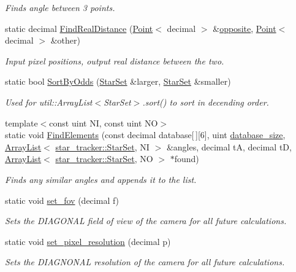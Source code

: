 \begin{DoxyCompactItemize}
\begin{DoxyCompactList}\small\item\em Finds angle between 3 points. \end{DoxyCompactList}\item 
static decimal \hyperlink{classstar__tracker_1_1StarSet_ac47b736928c744d3e5ec29a1362805e7}{Find\+Real\+Distance} (\hyperlink{classutil_1_1Point}{Point}$<$ decimal $>$ \&\hyperlink{classstar__tracker_1_1StarSet_aaefbde2ed32000e0d4a9a8104a685f0f}{opposite}, \hyperlink{classutil_1_1Point}{Point}$<$ decimal $>$ \&other)
\begin{DoxyCompactList}\small\item\em Input pixel positions, output real distance between the two. \end{DoxyCompactList}\item 
static bool \hyperlink{classstar__tracker_1_1StarSet_a6073fd52d08603e0e73729a8f6319b7c}{Sort\+By\+Odds} (\hyperlink{classstar__tracker_1_1StarSet}{Star\+Set} \&larger, \hyperlink{classstar__tracker_1_1StarSet}{Star\+Set} \&smaller)
\begin{DoxyCompactList}\small\item\em Used for util\+::\+Array\+List$<$\+Star\+Set$>$.\+sort() to sort in decending order. \end{DoxyCompactList}\item 
{\footnotesize template$<$const uint NI, const uint NO$>$ }\\static void \hyperlink{classstar__tracker_1_1StarSet_aa4f71efa0bebc7ba9ecb53dc4a3a03f0}{Find\+Elements} (const decimal database\mbox{[}$\,$\mbox{]}\mbox{[}6\mbox{]}, uint \hyperlink{namespacestar__tracker_aec9619ecae222c6615d448fa87324566}{database\+\_\+size}, \hyperlink{classutil_1_1ArrayList}{Array\+List}$<$ \hyperlink{classstar__tracker_1_1StarSet}{star\+\_\+tracker\+::\+Star\+Set}, NI $>$ \&angles, decimal tA, decimal tD, \hyperlink{classutil_1_1ArrayList}{Array\+List}$<$ \hyperlink{classstar__tracker_1_1StarSet}{star\+\_\+tracker\+::\+Star\+Set}, NO $>$ $\ast$found)
\begin{DoxyCompactList}\small\item\em Finds any similar angles and appends it to the list. \end{DoxyCompactList}\item 
static void \hyperlink{classstar__tracker_1_1StarSet_a4ac44bbf443182649f4607ca8375099f}{set\+\_\+fov} (decimal f)
\begin{DoxyCompactList}\small\item\em Sets the D\+I\+A\+G\+O\+N\+AL field of view of the camera for all future calculations. \end{DoxyCompactList}\item 
static void \hyperlink{classstar__tracker_1_1StarSet_a773579d8b4868f48a3bdbd23a7f3f55b}{set\+\_\+pixel\+\_\+resolution} (decimal p)
\begin{DoxyCompactList}\small\item\em Sets the D\+I\+A\+G\+N\+O\+N\+AL resolution of the camera for all future calculations. \end{DoxyCompactList}\end{DoxyCompactItemize}
